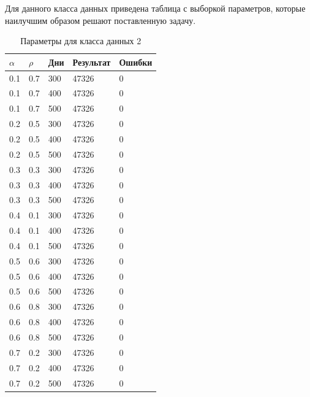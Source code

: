 Для данного класса данных приведена таблица с выборкой параметров, которые наилучшим образом решают поставленную задачу.

\begin{table}[!h]
	\begin{center}
		\begin{flushleft}
			\captionsetup{margin*=125pt}
			\caption{\label{tab:class2}Параметры для класса данных 2\label{tbl:table_kd2}}
		\end{flushleft}
		\begin{tabular}{|l | l | l | l | l | } \hline
				$\alpha$ & $\rho$ & Дни & Результат & Ошибки \\ \hline
					0.1 &  0.7 &  300 & 47326 &     0 \\
			0.1 &  0.7 &  400 & 47326 &     0 \\
			0.1 &  0.7 &  500 & 47326 &     0 \\
			\hline
			0.2 &  0.5 &  300 & 47326 &     0 \\
			0.2 &  0.5 &  400 & 47326 &     0 \\
			0.2 &  0.5 &  500 & 47326 &     0 \\
			\hline
				0.3 &  0.3 &  300 & 47326 &     0 \\
			0.3 &  0.3 &  400 & 47326 &     0 \\
			0.3 &  0.3 &  500 & 47326 &     0 \\
			\hline
			0.4 &  0.1 &  300 & 47326 &     0 \\
			0.4 &  0.1 &  400 & 47326 &     0 \\
			0.4 &  0.1 &  500 & 47326 &     0 \\
			\hline
			0.5 &  0.6 &  300 & 47326 &     0 \\
			0.5 &  0.6 &  400 & 47326 &     0 \\
			0.5 &  0.6 &  500 & 47326 &     0 \\
			\hline
			0.6 &  0.8 &  300 & 47326 &     0 \\
			0.6 &  0.8 &  400 & 47326 &     0 \\
			0.6 &  0.8 &  500 & 47326 &     0 \\
			\hline			
			0.7 &  0.2 &  300 & 47326 &     0 \\
			0.7 &  0.2 &  400 & 47326 &     0 \\
			0.7 &  0.2 &  500 & 47326 &     0 \\
				\hline
		\end{tabular}
	\end{center}
\end{table}

